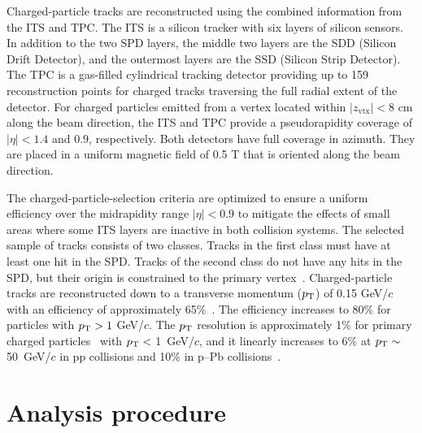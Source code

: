 Charged-particle tracks are reconstructed using the combined information from the ITS and TPC.
The ITS is a silicon tracker with six layers of silicon sensors. In addition to the two SPD layers, the middle two layers are the SDD (Silicon Drift Detector), and the outermost layers are the SSD (Silicon Strip Detector). The TPC is a gas-filled cylindrical tracking detector providing up to 159 reconstruction points for charged tracks traversing the full radial extent of the detector.
For charged particles emitted from a vertex located within $|z_\mathrm{vtx}|<8$ cm along the beam direction, the ITS and TPC provide a pseudorapidity coverage of $|\eta|<1.4$ and 0.9, respectively. Both detectors have full coverage in azimuth. They are placed in a uniform magnetic field of 0.5 T that is oriented along the beam direction.

The charged-particle-selection criteria are optimized to ensure a uniform efficiency over the midrapidity range $|\eta|<0.9$ to mitigate the effects of small areas where some ITS layers are inactive in both collision systems. The selected sample of tracks consists of two classes. Tracks in the first class must have at least one hit in the SPD. Tracks of the second class do not have any hits in the SPD, but their origin is constrained to the primary vertex~\cite{ALICE:2012eyl}. 
Charged-particle tracks are reconstructed down to a transverse momentum ($p_\mathrm{T}$) of 0.15 GeV/$c$ with an efficiency of approximately 65\%~\cite{Ivanov:2006yra}. The efficiency increases to 80\% for particles with $p_\mathrm{T}>1$ GeV/$c$. The $p_\mathrm{T}$ resolution is approximately 1\% for primary charged particles~\cite{ALICE-PUBLIC-2017-005} with $p_\mathrm{T}<$ 1~GeV/$c$, and it linearly increases to 6\% at $p_\mathrm{T}\sim$ 50~GeV/$c$ in pp collisions and 10\% in p--Pb collisions~\cite{ALICE:2018vuu}.



\section{Analysis procedure}
\label{sec:ana}
